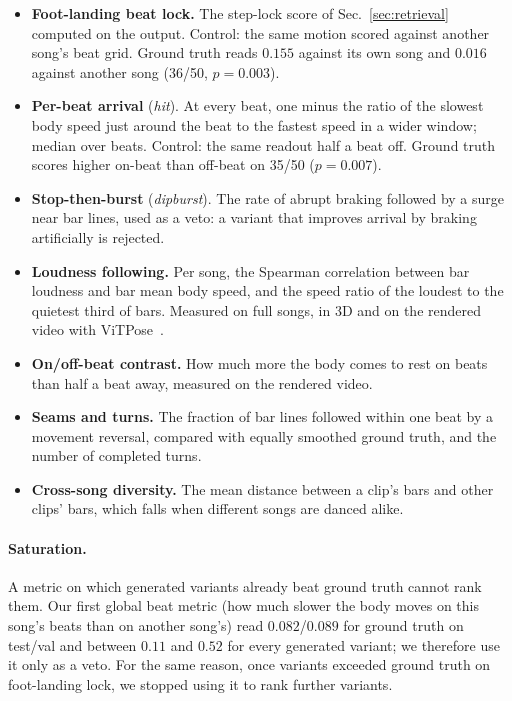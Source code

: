 \documentclass[10pt]{article}
\newcommand{\pairs}[2]{#1/#2}
\begin{document}
\begin{itemize}
  \item \textbf{Foot-landing beat lock.} The step-lock score of Sec.~\ref{sec:retrieval} computed on the output. Control: the same motion scored against another song's beat grid. Ground truth reads $0.155$ against its own song and $0.016$ against another song (\pairs{36}{50}, $p{=}0.003$).
  \item \textbf{Per-beat arrival} (\emph{hit}). At every beat, one minus the ratio of the slowest body speed just around the beat to the fastest speed in a wider window; median over beats. Control: the same readout half a beat off. Ground truth scores higher on-beat than off-beat on \pairs{35}{50} ($p{=}0.007$).
  \item \textbf{Stop-then-burst} (\emph{dipburst}). The rate of abrupt braking followed by a surge near bar lines, used as a veto: a variant that improves arrival by braking artificially is rejected.
  \item \textbf{Loudness following.} Per song, the Spearman correlation between bar loudness and bar mean body speed, and the speed ratio of the loudest to the quietest third of bars. Measured on full songs, in 3D and on the rendered video with ViTPose~\cite{xu2022vitpose}.
  \item \textbf{On/off-beat contrast.} How much more the body comes to rest on beats than half a beat away, measured on the rendered video.
  \item \textbf{Seams and turns.} The fraction of bar lines followed within one beat by a movement reversal, compared with equally smoothed ground truth, and the number of completed turns.
  \item \textbf{Cross-song diversity.} The mean distance between a clip's bars and other clips' bars, which falls when different songs are danced alike.
\end{itemize}

\paragraph{Saturation.}
A metric on which generated variants already beat ground truth cannot rank them.
Our first global beat metric (how much slower the body moves on this song's beats than on another song's) read $0.082$/$0.089$ for ground truth on test/val and between $0.11$ and $0.52$ for every generated variant; we therefore use it only as a veto.
For the same reason, once variants exceeded ground truth on foot-landing lock, we stopped using it to rank further variants.
\end{document}
